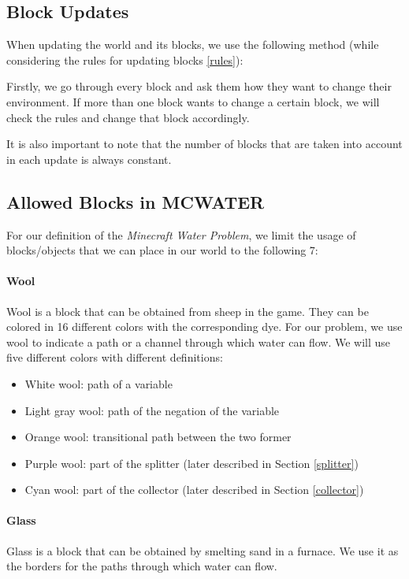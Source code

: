 \subsection{Block Updates} \label{blockupdates}

\noindent When updating the world and its blocks, we use the following method (while considering the rules for updating blocks \ref{rules}):

\noindent Firstly, we go through every block and ask them how they want to change their environment. If more than one block wants to change a certain block, we will check the rules and change that block accordingly. 

\noindent It is also important to note that the number of blocks that are taken into account in each update is always constant.

\pagebreak
\subsection{Allowed Blocks in MCWATER} \label{blocks}

\noindent For our definition of the \textit{Minecraft Water Problem}, we limit the usage of blocks/objects that we can place in our world to the following 7:
\paragraph{Wool}
Wool is a block that can be obtained from sheep in the game.
They can be colored in 16 different colors with the corresponding dye.
For our problem, we use wool to indicate a path or a channel through which water can flow.
We will use five different colors with different definitions:
\begin{itemize}
    \item White wool: path of a variable
    \item Light gray wool: path of the negation of the variable
    \item Orange wool: transitional path between the two former
    \item Purple wool: part of the splitter (later described in Section \ref{splitter})
    \item Cyan wool: part of the collector (later described in Section \ref{collector})
\end{itemize}

\paragraph{Glass}
Glass is a block that can be obtained by smelting sand in a furnace.
We use it as the borders for the paths through which water can flow.

